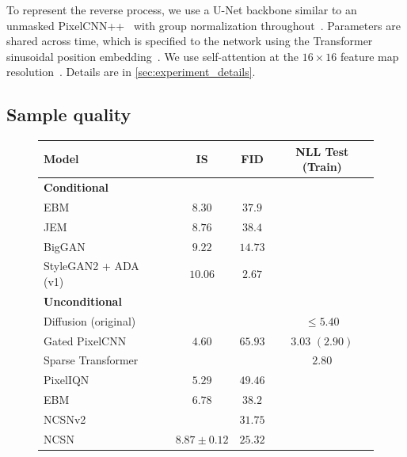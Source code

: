 \documentclass{article}
\begin{document}
To represent the reverse process, we use a U-Net backbone similar to an unmasked \mbox{PixelCNN++}~\citep{salimans2017pixelcnn++,ronneberger2015unet} with group normalization throughout~\citep{wu2018group}. Parameters are shared across time, which is specified to the network using the Transformer sinusoidal position embedding~\citep{vaswani2017attention}. We use self-attention at the $16 \times 16$ feature map resolution~\citep{wang2018non,vaswani2017attention}. Details are in \cref{sec:experiment_details}.


\subsection{Sample quality}

\begin{figure}
 \begin{minipage}{0.55\textwidth}
 \label{table:cifar10_results}
  \centering \scriptsize
  \vspace{-1em}
  \begin{tabular}{lccc}
    \toprule
    Model & IS & FID & NLL Test (Train) \\
    \midrule
    \textbf{Conditional} \\
    \midrule
    EBM~\citep{du2019implicit} & $8.30$ & $37.9$ \\
    JEM~\citep{grathwohl2020your} & $8.76$ & $38.4$ \\
    BigGAN~\citep{brock2018large} & $9.22$ & $14.73$ \\
    StyleGAN2 + ADA (v1)~\cite{karras2020training} & $\mathbf{10.06}$ & $\mathbf{2.67}$ \\
    \midrule
    \textbf{Unconditional} \\
    \midrule
    Diffusion (original)~\citep{sohl2015deep} & & & $\leq 5.40$ \\
    Gated PixelCNN~\citep{oord2016conditional} & $4.60$ & $65.93$ & $3.03$ $(2.90)$ \\
    Sparse Transformer~\citep{child2019generating} &   &  & $\mathbf{2.80}$ \\
    PixelIQN~\citep{ostrovski2018autoregressive} & $5.29$ & $49.46$ \\
    EBM~\citep{du2019implicit} & $6.78$ & $38.2$ \\
    NCSNv2~\citep{song2020improved} & & $31.75$ \\
    NCSN~\citep{song2019generative} & $8.87\!\pm\!0.12$ & $25.32$ \\

\end{tabular}
\end{minipage}
\end{figure}
\end{document}
